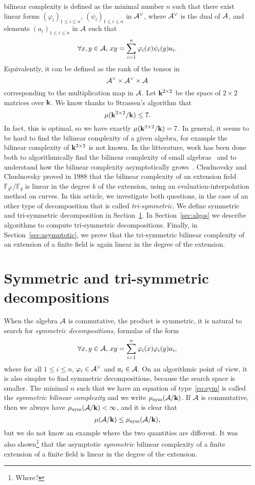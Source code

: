 \documentclass[a4paper,11pt]{article}
\begin{document}
bilinear complexity is defined as the minimal number $n$ such that there exist
linear forms $(\varphi_i)_{1\leq i \leq n}$, $(\psi_i)_{1\leq i \leq n}$ in
$\mathcal{A}^\vee$, where $\mathcal{A}^\vee$ is the dual of $\mathcal{A}$, and
elements $(a_i)_{1\leq i \leq n}$ in $\mathcal{A}$ such that
\begin{equation}
  \forall x, y\in\mathcal{A},\,xy = \sum_{i=1}^{n}\varphi_i(x)\psi_i(y)a_i.
  \label{eq:no-sym}
\end{equation}
Equivalently, it can be defined as the rank of the tensor in
\[
  \mathcal{A}^\vee \times \mathcal{A}^\vee\times \mathcal{A}
\]
corresponding to the multiplication map in $\mathcal{A}$. Let $\mathbf{k}^{2\times2}$ be the space
of $2\times2$ matrices over $\mathbf{k}$. We know thanks to Strassen's algorithm that 
\[
  \mu(\mathbf{k}^{2\times 2}/\mathbf{k}) \leq 7.
\]
In fact, this is optimal, so we have exactly $\mu(\mathbf{k}^{2\times2}/\mathbf{k})=7$. In
general, it seems to be hard to find the bilinear complexity of a given algebra,
for example the bilinear complexity of $\mathbf{k}^{3\times3}$ is not known.
In the litterature, work has been done both to algorithmically find the bilinear complexity of
small algebras~\cite{BDEZ12, Covanov19} and to understand how the bilinear
complexity asymptotically grows~\cite{CC88, BCPRRR19}. Chudnovsky and Chudnovsky
proved in 1988 that the bilinear complexity of an extension field
$\mathbb{F}_{q^k}/\mathbb{F}_{q}$ is linear in the degree $k$ of the
extension, using an evaluation-interpolation method on curves. In this article, we
investigate both questions, in the case of an other type of decomposition that
is called \emph{tri-symmetric}. We define symmetric and tri-symmetric
decomposition in Section~\ref{sec:symtrisym}. In Section~\ref{sec:algos} we
describe algorithms to compute tri-symmetric decompositions. Finally, in
Section~\ref{sec:asymptotic}, we prove that the tri-symmetric bilinear
complexity of an extension of a finite field is again linear in the degree of the
extension.

\section{Symmetric and tri-symmetric decompositions}
\label{sec:symtrisym}

When the algebra $\mathcal{A}$ is commutative, \ie the product is symmetric, it is
natural to search for \emph{symmetric decompositions}, \ie formulas of the form
\begin{equation}
  \forall x, y\in\mathcal{A},\,xy = \sum_{i=1}^{n}\varphi_i(x)\varphi_i(y)a_i,
  \label{eq:sym}
\end{equation}
where for all $1\leq i\leq n$, $\varphi_i\in\mathcal{A}^\vee$ and $a_i\in\mathcal{A}$. On an
algorithmic point of view, it is also simpler to find symmetric decompositions,
because the search space is smaller. The minimal $n$ such that we have an
equation of type~\eqref{eq:sym} is called the \emph{symmetric bilinear
complexity} and we write $\mu_{\text{sym}}(\mathcal{A}/\mathbf{k})$. If $\mathcal{A}$ is commutative, then
we always have $\mu_{\text{sym}}(\mathcal{A}/\mathbf{k})<\infty$, and it is clear that 
\[
  \mu(\mathcal{A}/\mathbf{k})\leq\mu_{\text{sym}}(\mathcal{A}/\mathbf{k}),
\]
but we do not know an example where the two quantities are different.
It was also shown\footnote{Where?} that the
asymptotic \emph{symmetric} bilinear complexity of a finite extension of a
finite field is linear in the degree of the extension.
\end{document}
